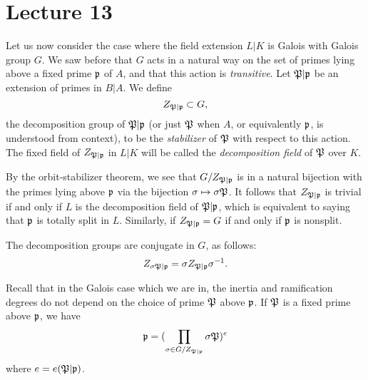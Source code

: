 \section{Lecture 13}

Let us now consider the case where the field extension $L|K$ is Galois with Galois group $G$.
We saw before that $G$ acts in a natural way on the set of primes lying above a fixed prime $\mathfrak{p}$ of $A$, and that this action is \emph{transitive}.
Let $\mathfrak{P}|\mathfrak{p}$ be an extension of primes in $B|A$.
We define
\[ Z_{\mathfrak{P}|\mathfrak{p}} \subset G, \]
the decomposition group of $\mathfrak{P}|\mathfrak{p}$ (or just $\mathfrak{P}$ when $A$, or equivalently $\mathfrak{p}$, is understood from context), to be the \emph{stabilizer} of $\mathfrak{P}$ with respect to this action.
The fixed field of $Z_{\mathfrak{P}|\mathfrak{p}}$ in $L|K$ will be called the \emph{decomposition field} of $\mathfrak{P}$ over $K$.

By the orbit-stabilizer theorem, we see that $G/Z_{\mathfrak{P}|\mathfrak{p}}$ is in a natural bijection with the primes lying above $\mathfrak{p}$ via the bijection $\sigma \mapsto \sigma\mathfrak{P}$.
It follows that $Z_{\mathfrak{P}|\mathfrak{p}}$ is trivial if and only if $L$ is the decomposition field of $\mathfrak{P}|\mathfrak{p}$, which is equivalent to saying that $\mathfrak{p}$ is totally split in $L$.
Similarly, if $Z_{\mathfrak{P}|\mathfrak{p}} = G$ if and only if $\mathfrak{p}$ is nonsplit.

The decomposition groups are conjugate in $G$, as follows:
\[ Z_{\sigma\mathfrak{P}|\mathfrak{p}} = \sigma Z_{\mathfrak{P}|\mathfrak{p}} \sigma^{-1}. \]

Recall that in the Galois case which we are in, the inertia and ramification degrees do not depend on the choice of prime $\mathfrak{P}$ above $\mathfrak{p}$.
If $\mathfrak{P}$ is a fixed prime above $\mathfrak{p}$, we have
\[ \mathfrak{p} = (\prod_{\sigma \in G/Z_{\mathfrak{P}|\mathfrak{p}}} \sigma\mathfrak{P})^{e} \]
where $e = e(\mathfrak{P}|\mathfrak{p})$.

